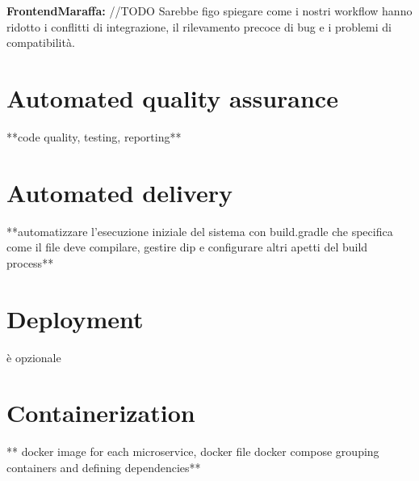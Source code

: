\textbf{FrontendMaraffa:} //TODO
Sarebbe figo spiegare come i nostri workflow hanno ridotto i conflitti di integrazione, il rilevamento precoce di bug e i problemi di compatibilità.

\section{Automated quality assurance}
**code quality, testing, reporting**
\section{Automated delivery}
**automatizzare l'esecuzione iniziale del sistema con build.gradle che specifica come
il file deve compilare, gestire dip e configurare altri apetti del build process**
\section{Deployment}
è opzionale
\section{Containerization}
** docker image for each microservice, docker file
docker compose grouping containers and defining dependencies**


